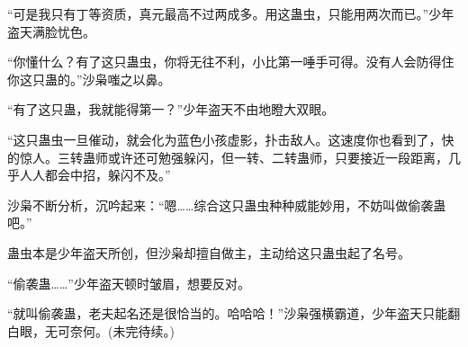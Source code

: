 \begin{this_body}
“可是我只有丁等资质，真元最高不过两成多。用这蛊虫，只能用两次而已。”少年盗天满脸忧色。

“你懂什么？有了这只蛊虫，你将无往不利，小比第一唾手可得。没有人会防得住你这只蛊的。”沙枭嗤之以鼻。

“有了这只蛊，我就能得第一？”少年盗天不由地瞪大双眼。

“这只蛊虫一旦催动，就会化为蓝色小孩虚影，扑击敌人。这速度你也看到了，快的惊人。三转蛊师或许还可勉强躲闪，但一转、二转蛊师，只要接近一段距离，几乎人人都会中招，躲闪不及。”

沙枭不断分析，沉吟起来：“嗯……综合这只蛊虫种种威能妙用，不妨叫做偷袭蛊吧。”

蛊虫本是少年盗天所创，但沙枭却擅自做主，主动给这只蛊虫起了名号。

“偷袭蛊……”少年盗天顿时皱眉，想要反对。

“就叫偷袭蛊，老夫起名还是很恰当的。哈哈哈！”沙枭强横霸道，少年盗天只能翻白眼，无可奈何。(未完待续。)

\end{this_body}


